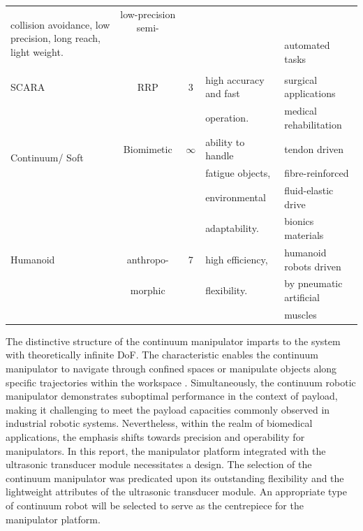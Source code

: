 \begin{center}
\begin{longtable}{l c c l l}
    \multirow{3}{*}{\parbox{40mm}{collision avoidance, low precision, long reach, light weight.}} &
    low-precision semi- \\
    & & & & automated tasks \cite{RRR_application1,RRR_application2}\\
    & & & & \\
    SCARA \cite{SCARA_review}& RRP & 3 & 
    high accuracy and fast  &
    surgical applications \cite{SCARA_application1}\\
    & & & operation. & medical rehabilitation \cite{SCARA_application2}\\
    \multirow{2}{25mm}{Continuum/ Soft \cite{soft_review1,soft_review2}} & Biomimetic & $\infty$ & 
    ability to handle  & 
    tendon driven \cite{tenden_driven_application1, tenden_driven_application2,tenden_driven_application3}\\
    & & & fatigue objects, & fibre-reinforced \cite{fiber_application1,fiber_application2}\\
    & & & environmental & fluid-elastic drive \cite{fluid_application1,fluid_application2,fluid_application3}\\
    & & & adaptability. & bionics materials \cite{SMA,dielectric_high-elastic_polymers,IPMC}\\
    Humanoid & anthropo- & 7 & high efficiency, & humanoid robots driven \\
    & morphic& & flexibility.& by pneumatic artificial\\ 
    & & & & muscles \cite{humanoid_7dof}\\ \hline
    \end{longtable}
\end{center}
\vspace{-10mm}
\noindent The distinctive structure of the continuum manipulator imparts to the system with theoretically 
infinite DoF. The characteristic enables the continuum manipulator to navigate through confined spaces 
or manipulate objects along specific trajectories within the workspace \cite{CR_medical_application,
soft_review1,soft_review2}. Simultaneously, the continuum robotic
manipulator demonstrates suboptimal performance in the context of payload, making it challenging to meet 
the payload capacities commonly observed in industrial robotic systems. Nevertheless, within the realm 
of biomedical applications, the emphasis shifts towards precision and operability for manipulators. In this 
report, the manipulator platform integrated with the ultrasonic transducer module necessitates a design. 
The selection of the continuum manipulator was predicated upon its outstanding flexibility and the 
lightweight attributes of the ultrasonic transducer module. An appropriate type of continuum robot 
will be selected to serve as the centrepiece for the manipulator platform.
